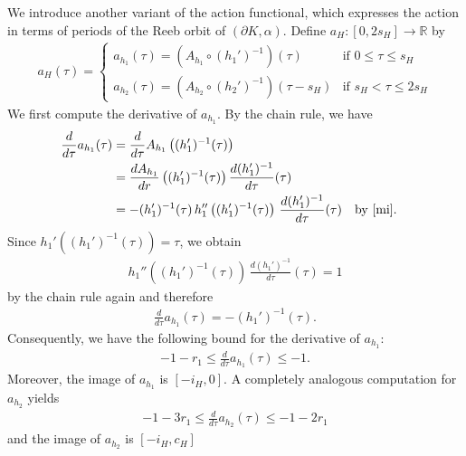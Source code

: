 \documentclass[12pt]{amsart}
\theoremstyle{definition}
\newcommand{\RR}{{\mathbb R}}
\begin{document}
We introduce another variant of the action functional, which expresses the action in terms of periods of the Reeb orbit of $(\partial K, \alpha)$. Define $a_{H} : [0, 2 s_H] \to \RR$ by
\begin{align*}
    a_H (\tau) = \begin{cases}
         a_{h_1}(\tau)=\left(A_{h_1} \circ (h_1')^{-1}\right)(\tau) &\textrm{if}\,\,0\leq \tau \leq s_H\\
         a_{h_2}(\tau)=\left(A_{h_2} \circ (h_2')^{-1}\right)(\tau- s_H) &\textrm{if}\,\,s_H < \tau  \leq 2 s_H
    \end{cases}
\end{align*}
We first compute the derivative of $a_{h_1}$. By the chain rule, we have
\begin{align*}
    \frac{d}{d\tau}a_{h_1}(\tau)& = \frac{d}{d\tau}A_{h_1}\left((h_1')^{-1}(\tau)\right) \\&= \frac{d A_{h_1}}{dr}\left((h_1')^{-1}(\tau)\right) \frac{d (h_1')^{-1}}{d\tau}(\tau)
    \\&=-(h_1')^{-1}(\tau) \,h_1''\left((h_1')^{-1}(\tau)\right) \,\frac{d (h_1')^{-1}}{d\tau}(\tau) &&\textrm{by \eqref{mi}}.
    \end{align*}
    Since $h_1'\left((h_1')^{-1}(\tau)\right) = \tau$, we obtain
    \begin{align*}
        h_1''\left((h_1')^{-1}(\tau)\right) \,\frac{d (h_1')^{-1}}{d\tau}(\tau) = 1
    \end{align*}
    by the chain rule again and therefore
    \begin{align*}
        \frac{d}{d\tau}a_{h_1}(\tau) = -(h_1')^{-1}(\tau) .
    \end{align*}
    Consequently, we have the following bound for the derivative of $a_{h_1}$:
    \begin{align}\label{bound}
       -1-r_1 \leq \frac{d}{d\tau}a_{h_1}(\tau) \leq -1.
    \end{align}
    Moreover, the image of $a_{h_1}$ is $[-i_H,0]$. A completely analogous computation for $a_{h_2}$ yields 
\begin{align*}
    -1-3r_1 \leq \frac{d}{d\tau}a_{h_2}(\tau) \leq - 1-2r_1
\end{align*}
and the image of $a_{h_2}$ is $[-i_H,c_H]$

\vspace{0.2 cm}
\end{document}
